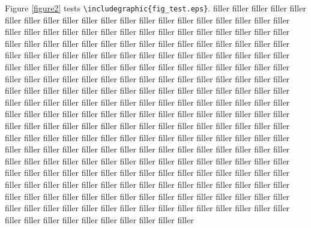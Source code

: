 \documentclass{article}
\begin{document}
Figure \ref{figure2} tests \verb#\includegraphic{fig_test.eps}#.
filler filler filler filler filler filler filler filler filler
filler filler filler filler filler filler filler filler filler
filler filler filler filler filler filler filler filler filler
filler filler filler filler filler filler filler filler filler
filler filler filler filler filler filler filler filler filler
filler filler filler filler filler filler filler filler filler
filler filler filler filler filler filler filler filler filler
filler filler filler filler filler filler filler filler filler
filler filler filler filler filler filler filler filler filler
filler filler filler filler filler filler filler filler filler
filler filler filler filler filler filler filler filler filler
filler filler filler filler filler filler filler filler filler
filler filler filler filler filler filler filler filler filler
filler filler filler filler filler filler filler filler filler
filler filler filler filler filler filler filler filler filler
filler filler filler filler filler filler filler filler filler
filler filler filler filler filler filler filler filler filler
filler filler filler filler filler filler filler filler filler
filler filler filler filler filler filler filler filler filler
filler filler filler filler filler filler filler filler filler
filler filler filler filler filler filler filler filler filler
filler filler filler filler filler filler filler filler filler
filler filler filler filler filler filler filler filler filler
filler filler filler filler filler filler filler filler filler
filler filler filler filler filler filler filler filler filler
filler filler filler filler filler filler filler filler filler
filler filler filler filler filler filler filler filler filler
filler filler filler filler filler filler filler filler filler
filler filler filler filler filler filler filler filler filler
filler filler filler filler filler filler filler filler filler
\end{document}
